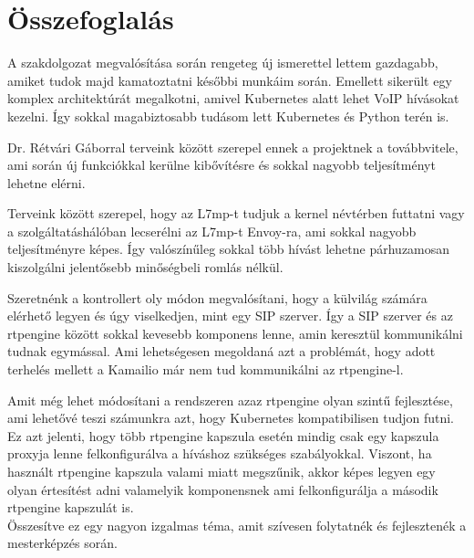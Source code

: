 \chapter{Összefoglalás}

A szakdolgozat megvalósítása során rengeteg új ismerettel lettem gazdagabb, 
amiket tudok majd kamatoztatni későbbi munkáim során. Emellett sikerült 
egy komplex architektúrát megalkotni, amivel Kubernetes alatt lehet 
VoIP hívásokat kezelni. Így sokkal magabiztosabb tudásom lett Kubernetes és 
Python terén is. 

Dr. Rétvári Gáborral terveink között szerepel ennek a projektnek a továbbvitele, 
ami során új funkciókkal kerülne kibővítésre és sokkal nagyobb teljesítményt 
lehetne elérni. 

Terveink között szerepel, hogy az L7mp-t tudjuk a kernel névtérben futtatni vagy 
a szolgáltatáshálóban lecserélni az L7mp-t Envoy-ra, ami sokkal nagyobb teljesítményre
képes. Így valószínűleg sokkal több hívást lehetne párhuzamosan kiszolgálni jelentősebb
minőségbeli romlás nélkül. 

Szeretnénk a kontrollert oly módon megvalósítani, hogy a külvilág számára elérhető
legyen és úgy viselkedjen, mint egy SIP szerver. Így a SIP szerver és az rtpengine 
között sokkal kevesebb komponens lenne, amin keresztül kommunikálni tudnak egymással. 
Ami lehetségesen megoldaná azt a problémát, hogy adott terhelés mellett a Kamailio
már nem tud kommunikálni az rtpengine-l.

Amit még lehet módosítani a rendszeren azaz rtpengine olyan szintű fejlesztése, ami 
lehetővé teszi számunkra azt, hogy Kubernetes kompatibilisen tudjon futni. Ez azt jelenti,
hogy több rtpengine kapszula esetén mindig csak egy kapszula proxyja lenne felkonfigurálva
a híváshoz szükséges szabályokkal. Viszont, ha használt rtpengine kapszula valami miatt 
megszűnik, akkor képes legyen egy olyan értesítést adni valamelyik komponensnek ami 
felkonfigurálja a második rtpengine kapszulát is. \\

Összesítve ez egy nagyon izgalmas téma, amit szívesen folytatnék és fejlesztenék 
a mesterképzés során. 